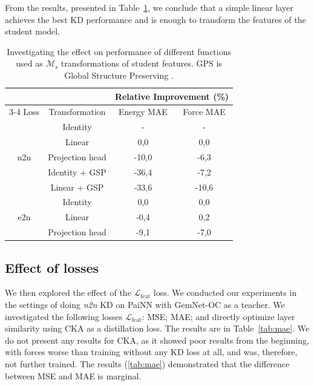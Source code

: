 \documentclass{article}
\newcommand{\loss}{\mathcal{L}}
\begin{document}
From the results, presented in Table~\ref{tab:projhead}, we conclude that a simple linear layer achieves the best KD performance and is enough to transform the features of the student model.

\begin{table}[h]
\centering
\caption{\label{tab:projhead} Investigating the effect on performance of different functions used as $\mathcal{M}_\text{s}$ transformations of student features. GPS is Global Structure Preserving \cite{joshi2022}. }
\begin{tabular}{cccc}
                         &                 & \multicolumn{2}{c}{Relative Improvement (\%)} \\ \cline{3-4} 
Loss                     & Transformation  & Energy MAE            & Force MAE            \\ \hline
\multicolumn{1}{c|}{}    & Identity        & -                     & -                    \\
\multicolumn{1}{c|}{}    & Linear          & 0,0                   & 0,0                  \\
\multicolumn{1}{c|}{n2n} & Projection head & -10,0                 & -6,3                 \\
\multicolumn{1}{c|}{}    & Identity + GSP  & -36,4                 & -7,2                 \\
\multicolumn{1}{c|}{}    & Linear + GSP    & -33,6                 & -10,6                \\ \hline
\multicolumn{1}{c|}{}    & Identity        & 0,0                   & 0,0                  \\
\multicolumn{1}{c|}{e2n} & Linear          & -0,4                  & 0,2                  \\
\multicolumn{1}{c|}{}    & Projection head & -9,1                  & -7,0                
\end{tabular}
\end{table}


\subsection{Effect of losses}
\label{ap:losses}
We then explored the effect of the $\loss_\text{feat}$ loss. We conducted our experiments in the settings of doing \emph{n2n} KD on PaiNN with GemNet-OC as a teacher. We investigated the following losses $\loss_\text{feat}$: MSE; MAE; and directly optimize layer similarity using CKA as a distillation loss. The results are in Table~\ref{tab:mae}. We do not present any results for CKA, as it showed poor results from the beginning, with forces worse than training without any KD loss at all, and was, therefore, not further trained.
The results (\cref{tab:mae}) demonstrated that the difference between MSE and MAE is marginal.
\end{document}
